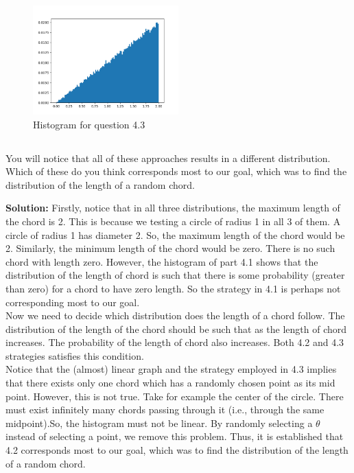 \documentclass[answers]{exam}
\begin{document}
\begin{framed}
\begin{figure}[H] %
    \centering
    \includegraphics[width= 0.5\textwidth]{Q4.3_histogram.png}
    \caption{Histogram for question 4.3}
\end{figure}

\end{framed}

\subsection{} You will notice that all of these approaches results in a different distribution. Which of these do you think corresponds most to our goal, which was to find the distribution of the length of a random chord.
\begin{framed}
\textbf{Solution:} Firstly, notice that in all three distributions, the maximum length of the chord is 2. This is because we testing a circle of radius 1 in all 3 of them. A circle of radius 1 has diameter 2. So, the maximum length of the chord would be 2. Similarly, the minimum length of the chord would be zero. There is no such chord with length zero. However, the histogram of part 4.1 shows that the distribution of the length of chord is such that there is some probability (greater than zero) for a chord to have zero length. So the strategy in 4.1 is perhaps not corresponding most to our goal. \\ 
Now we need to decide which distribution does the length of a chord follow. The distribution of the length of the chord should be such that as the length of chord increases. The probability of the length of chord also increases. Both 4.2 and 4.3 strategies satisfies this condition. \\
Notice that the (almost) linear graph and the strategy employed in 4.3 implies that there exists only one chord which has a randomly chosen point as its mid point. However, this is not true. Take for example the center of the circle. There must exist infinitely many chords passing through it (i.e., through the same midpoint).So, the histogram must not be linear. By randomly selecting a $\theta$ instead of selecting a point, we remove this problem. Thus, it is established that 4.2 corresponds most to our goal, which was to find the distribution of the length of a random chord. \\
\end{framed}
\end{document}
